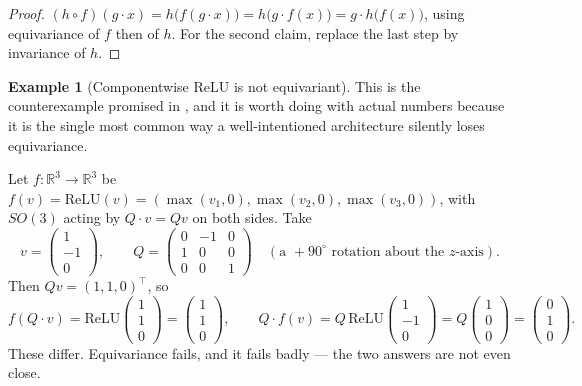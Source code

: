\documentclass[11pt,a4paper]{report}
\theoremstyle{definition}
\newtheorem{example}[example]{Example}
\theoremstyle{remark}
\newcommand{\RR}{\mathbb R}
\begin{document}
\begin{proof}
$(h\circ f)(g\cdot x) = h\bigl(f(g\cdot x)\bigr) = h\bigl(g\cdot f(x)\bigr)
= g\cdot h\bigl(f(x)\bigr)$, using equivariance of $f$ then of $h$. For the
second claim, replace the last step by invariance of $h$.
\end{proof}

\begin{example}[Componentwise $\mathrm{ReLU}$ is not equivariant]
\label{ex:relu-not-equivariant}
This is the counterexample promised in , and it
is worth doing with actual numbers because it is the single most common way
a well-intentioned architecture silently loses equivariance.

Let $f:\RR^3\to\RR^3$ be $f(v)=\mathrm{ReLU}(v)=(\max(v_1,0),\max(v_2,0),\max(v_3,0))$,
with $SO(3)$ acting by $Q\cdot v=Qv$ on both sides. Take
\[
v=\begin{pmatrix}1\\-1\\0\end{pmatrix},
\qquad
Q=\begin{pmatrix}0&-1&0\\1&0&0\\0&0&1\end{pmatrix}
\quad(\text{a } +90^\circ \text{ rotation about the } z\text{-axis}).
\]
Then $Qv=(1,1,0)^\top$, so
\[
f(Q\cdot v)=\mathrm{ReLU}\begin{pmatrix}1\\1\\0\end{pmatrix}=\begin{pmatrix}1\\1\\0\end{pmatrix},
\qquad
Q\cdot f(v)=Q\,\mathrm{ReLU}\begin{pmatrix}1\\-1\\0\end{pmatrix}
=Q\begin{pmatrix}1\\0\\0\end{pmatrix}=\begin{pmatrix}0\\1\\0\end{pmatrix} .
\]
These differ. Equivariance fails, and it fails badly --- the two answers are
not even close.


\end{example}
\end{document}
